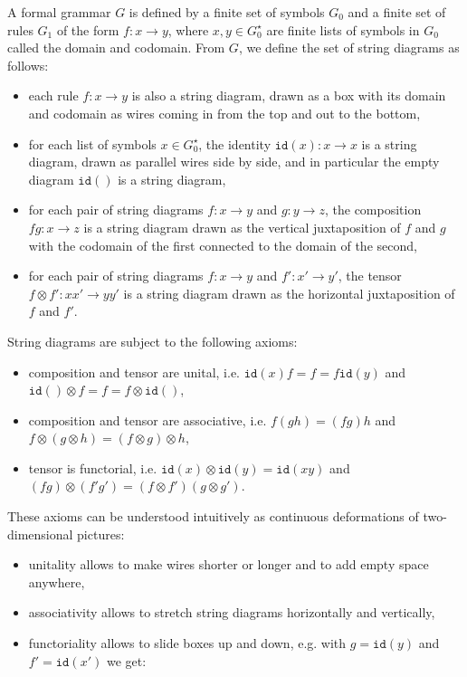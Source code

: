 A formal grammar $G$ is defined by a finite set of symbols $G_0$ and a finite set of rules $G_1$ of the form $f : x \to y$, where $x, y \in G_0^\star$ are finite lists of symbols in $G_0$ called the domain and codomain.
From $G$, we define the set of string diagrams as follows:
\begin{itemize}
\item each rule $f : x \to y$ is also a string diagram, drawn as a box with its domain and codomain as wires coming in from the top and out to the bottom,
\item for each list of symbols $x \in G_0^\star$, the identity $\mathtt{id}(x) : x \to x$ is a string diagram, drawn as parallel wires side by side, and in particular the empty diagram $\mathtt{id}()$ is a string diagram,
\item for each pair of string diagrams $f : x \to y$ and $g : y \to z$, the composition $f g : x \to z$ is a string diagram drawn as the vertical juxtaposition of $f$ and $g$ with the codomain of the first connected to the domain of the second,
\item for each pair of string diagrams $f : x \to y$ and $f' : x' \to y'$, the tensor $f \otimes f' : xx' \to yy'$ is a string diagram drawn as the horizontal juxtaposition of $f$ and $f'$.
\end{itemize}
String diagrams are subject to the following axioms:
\begin{itemize}
\item composition and tensor are unital, i.e. $\mathtt{id}(x) f = f = f \mathtt{id}(y)$ and $\mathtt{id}() \otimes f = f = f \otimes \mathtt{id}()$,
\item composition and tensor are associative, i.e. $f(gh) = (fg)h$ and $f \otimes (g \otimes h) = (f \otimes g) \otimes h$,
\item tensor is functorial, i.e. $\mathtt{id}(x) \otimes \mathtt{id}(y) = \mathtt{id}(xy)$ and $(fg) \otimes (f'g') = (f \otimes f')(g \otimes g')$.
\end{itemize}
These axioms can be understood intuitively as continuous deformations of two-dimensional pictures:
\begin{itemize}
\item unitality allows to make wires shorter or longer and to add empty space anywhere,
\item associativity allows to stretch string diagrams horizontally and vertically,
\item functoriality allows to slide boxes up and down, e.g. with $g = \mathtt{id}(y)$ and $f' = \mathtt{id}(x')$ we get:
\end{itemize}
\begin{center}

\end{center}

